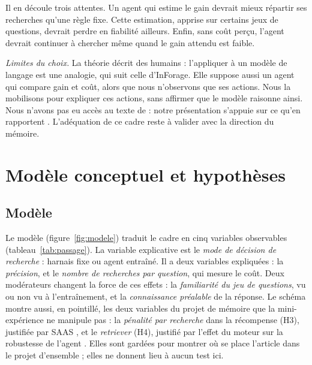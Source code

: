 \documentclass[11pt,a4paper]{article}
\begin{document}
Il en découle trois attentes. Un agent qui estime le gain devrait mieux répartir ses recherches qu'une règle fixe. Cette estimation, apprise sur certains jeux de questions, devrait perdre en fiabilité ailleurs. Enfin, sans coût perçu, l'agent devrait continuer à chercher même quand le gain attendu est faible.

\emph{Limites du choix.} La théorie décrit des humains : l'appliquer à un modèle de langage est une analogie, qui suit celle d'InForage. Elle suppose aussi un agent qui compare gain et coût, alors que nous n'observons que ses actions. Nous la mobilisons pour expliquer ces actions, sans affirmer que le modèle raisonne ainsi. Nous n'avons pas eu accès au texte de \citet{pirolli1999information} : notre présentation s'appuie sur ce qu'en rapportent \citet{qian2025scent}. L'adéquation de ce cadre reste à valider avec la direction du mémoire.

\section{Modèle conceptuel et hypothèses}\label{sec:hyp}

\subsection{Modèle}
Le modèle (figure~\ref{fig:modele}) traduit le cadre en cinq variables observables (tableau~\ref{tab:passage}). La variable explicative est le \emph{mode de décision de recherche} : harnais fixe ou agent entraîné. Il a deux variables expliquées : la \emph{précision}, et le \emph{nombre de recherches par question}, qui mesure le coût. Deux modérateurs changent la force de ces effets : la \emph{familiarité du jeu de questions}, vu ou non vu à l'entraînement, et la \emph{connaissance préalable} de la réponse. Le schéma montre aussi, en pointillé, les deux variables du projet de mémoire que la mini-expérience ne manipule pas : la \emph{pénalité par recherche} dans la récompense (H3), justifiée par SAAS \citep{tang2026saas}, et le \emph{retriever} (H4), justifié par l'effet du moteur sur la robustesse de l'agent \citep{jin2025empirical}. Elles sont gardées pour montrer où se place l'article dans le projet d'ensemble ; elles ne donnent lieu à aucun test ici.
\end{document}
